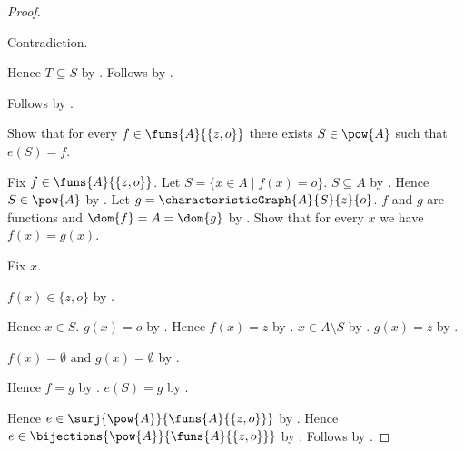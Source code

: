 \begin{proof}
\begin{subproof}
\begin{subproof}
\begin{subproof}
                Contradiction.
            \end{subproof}
            Hence $T\subseteq S$ by .
            Follows by .
        \end{subproof}
        Follows by .
    \end{subproof}
    Show that for every $f\in\funs{A}{\{z,o\}}$ there exists
        $S\in\pow{A}$ such that $e(S)=f$.
    \begin{subproof}
        Fix $f\in\funs{A}{\{z,o\}}$.
        Let $S=\{x\in A\mid f(x)=o\}$.
        $S\subseteq A$ by .
        Hence $S\in\pow{A}$ by .
        Let $g=\characteristicGraph{A}{S}{z}{o}$.
        $f$ and $g$ are functions and $\dom{f}=A=\dom{g}$
            by
            .
        Show that for every $x$ we have $f(x)=g(x)$.
        \begin{subproof}
            Fix $x$.
            \begin{byCase}
                    $f(x)\in\{z,o\}$ by .
                    \begin{byCase}
                            Hence $x\in S$.
                            $g(x)=o$ by .
                            Hence $f(x)=z$ by
                                .
                            $x\in A\setminus S$ by .
                            $g(x)=z$ by .
                    \end{byCase}
                    $f(x)=\emptyset$ and $g(x)=\emptyset$
                        by .
            \end{byCase}
        \end{subproof}
        Hence $f=g$ by .
        $e(S)=g$ by .
    \end{subproof}
    Hence $e\in\surj{\pow{A}}{\funs{A}{\{z,o\}}}$ by .
    Hence $e\in\bijections{\pow{A}}{\funs{A}{\{z,o\}}}$
        by .
    Follows by .
\end{proof}


